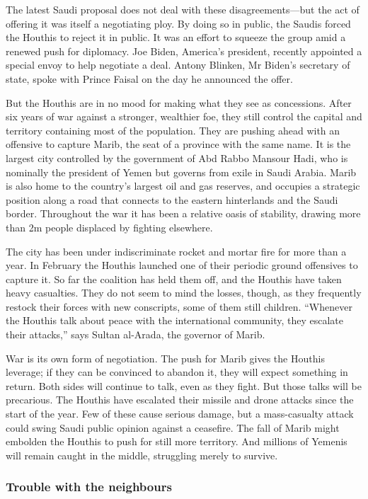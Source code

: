 \documentclass{article}
\begin{document}
The latest Saudi proposal does not deal with these disagreements---but the act of offering it was itself a negotiating ploy. By doing so in public, the Saudis forced the Houthis to reject it in public. It was an effort to squeeze the group amid a renewed push for diplomacy. Joe Biden, America's president, recently appointed a special envoy to help negotiate a deal. Antony Blinken, Mr Biden's secretary of state, spoke with Prince Faisal on the day he announced the offer. 

But the Houthis are in no mood for making what they see as concessions. After six years of war against a stronger, wealthier foe, they still control the capital and territory containing most of the population. They are pushing ahead with an offensive to capture Marib, the seat of a province with the same name. It is the largest city controlled by the government of Abd Rabbo Mansour Hadi, who is nominally the president of Yemen but governs from exile in Saudi Arabia. Marib is also home to the country's largest oil and gas reserves, and occupies a strategic position along a road that connects to the eastern hinterlands and the Saudi border. Throughout the war it has been a relative oasis of stability, drawing more than 2m people displaced by fighting elsewhere. 

The city has been under indiscriminate rocket and mortar fire for more than a year. In February the Houthis launched one of their periodic ground offensives to capture it. So far the coalition has held them off, and the Houthis have taken heavy casualties. They do not seem to mind the losses, though, as they frequently restock their forces with new conscripts, some of them still children. ``Whenever the Houthis talk about peace with the international community, they escalate their attacks,'' says Sultan al-Arada, the governor of Marib. 

War is its own form of negotiation. The push for Marib gives the Houthis leverage; if they can be convinced to abandon it, they will expect something in return. Both sides will continue to talk, even as they fight. But those talks will be precarious. The Houthis have escalated their missile and drone attacks since the start of the year. Few of these cause serious damage, but a mass-casualty attack could swing Saudi public opinion against a ceasefire. The fall of Marib might embolden the Houthis to push for still more territory. And millions of Yemenis will remain caught in the middle, struggling merely to survive.{} 
\clearpage
\subsubsection{Trouble with the neighbours }
\end{document}
